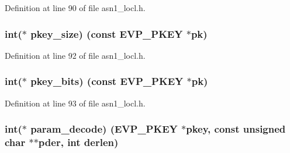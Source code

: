 Definition at line 90 of file asn1\+\_\+locl.\+h.

\subsubsection[{\texorpdfstring{pkey\+\_\+size}{pkey_size}}]{\setlength{\rightskip}{0pt plus 5cm}int($\ast$ pkey\+\_\+size) (const {\bf E\+V\+P\+\_\+\+P\+K\+EY} $\ast$pk)}\hypertarget{structevp__pkey__asn1__method__st_ae7d7e837164cb9faaf4f5fee73be26b0}{}\label{structevp__pkey__asn1__method__st_ae7d7e837164cb9faaf4f5fee73be26b0}


Definition at line 92 of file asn1\+\_\+locl.\+h.

\subsubsection[{\texorpdfstring{pkey\+\_\+bits}{pkey_bits}}]{\setlength{\rightskip}{0pt plus 5cm}int($\ast$ pkey\+\_\+bits) (const {\bf E\+V\+P\+\_\+\+P\+K\+EY} $\ast$pk)}\hypertarget{structevp__pkey__asn1__method__st_ace4959fec88f00dc280d3bca7376e3db}{}\label{structevp__pkey__asn1__method__st_ace4959fec88f00dc280d3bca7376e3db}


Definition at line 93 of file asn1\+\_\+locl.\+h.

\subsubsection[{\texorpdfstring{param\+\_\+decode}{param_decode}}]{\setlength{\rightskip}{0pt plus 5cm}int($\ast$ param\+\_\+decode) ({\bf E\+V\+P\+\_\+\+P\+K\+EY} $\ast$pkey, const unsigned char $\ast$$\ast$pder, int derlen)}\hypertarget{structevp__pkey__asn1__method__st_ae30b361ec352090eb78a684cfd1b561a}{}\label{structevp__pkey__asn1__method__st_ae30b361ec352090eb78a684cfd1b561a}


